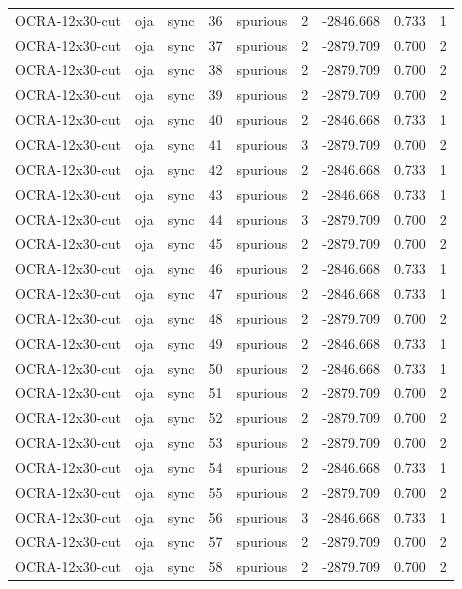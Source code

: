 \begin{tabular}{lllrlrrrr}
OCRA-12x30-cut & oja & sync & 36 & spurious & 2 & -2846.668 & 0.733 & 1 \\
OCRA-12x30-cut & oja & sync & 37 & spurious & 2 & -2879.709 & 0.700 & 2 \\
OCRA-12x30-cut & oja & sync & 38 & spurious & 2 & -2879.709 & 0.700 & 2 \\
OCRA-12x30-cut & oja & sync & 39 & spurious & 2 & -2879.709 & 0.700 & 2 \\
OCRA-12x30-cut & oja & sync & 40 & spurious & 2 & -2846.668 & 0.733 & 1 \\
OCRA-12x30-cut & oja & sync & 41 & spurious & 3 & -2879.709 & 0.700 & 2 \\
OCRA-12x30-cut & oja & sync & 42 & spurious & 2 & -2846.668 & 0.733 & 1 \\
OCRA-12x30-cut & oja & sync & 43 & spurious & 2 & -2846.668 & 0.733 & 1 \\
OCRA-12x30-cut & oja & sync & 44 & spurious & 3 & -2879.709 & 0.700 & 2 \\
OCRA-12x30-cut & oja & sync & 45 & spurious & 2 & -2879.709 & 0.700 & 2 \\
OCRA-12x30-cut & oja & sync & 46 & spurious & 2 & -2846.668 & 0.733 & 1 \\
OCRA-12x30-cut & oja & sync & 47 & spurious & 2 & -2846.668 & 0.733 & 1 \\
OCRA-12x30-cut & oja & sync & 48 & spurious & 2 & -2879.709 & 0.700 & 2 \\
OCRA-12x30-cut & oja & sync & 49 & spurious & 2 & -2846.668 & 0.733 & 1 \\
OCRA-12x30-cut & oja & sync & 50 & spurious & 2 & -2846.668 & 0.733 & 1 \\
OCRA-12x30-cut & oja & sync & 51 & spurious & 2 & -2879.709 & 0.700 & 2 \\
OCRA-12x30-cut & oja & sync & 52 & spurious & 2 & -2879.709 & 0.700 & 2 \\
OCRA-12x30-cut & oja & sync & 53 & spurious & 2 & -2879.709 & 0.700 & 2 \\
OCRA-12x30-cut & oja & sync & 54 & spurious & 2 & -2846.668 & 0.733 & 1 \\
OCRA-12x30-cut & oja & sync & 55 & spurious & 2 & -2879.709 & 0.700 & 2 \\
OCRA-12x30-cut & oja & sync & 56 & spurious & 3 & -2846.668 & 0.733 & 1 \\
OCRA-12x30-cut & oja & sync & 57 & spurious & 2 & -2879.709 & 0.700 & 2 \\
OCRA-12x30-cut & oja & sync & 58 & spurious & 2 & -2879.709 & 0.700 & 2 \\

\end{tabular}
